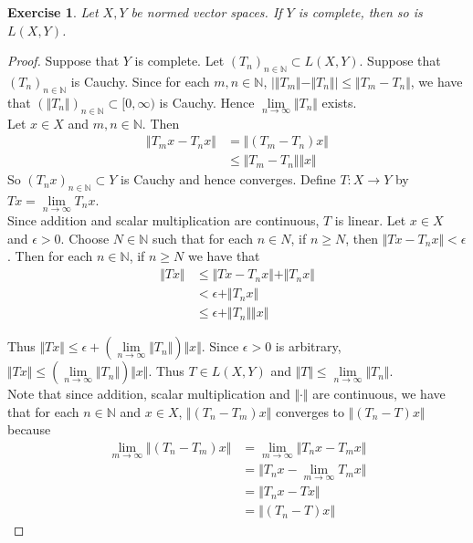 \documentclass[12pt]{amsart}
\newtheorem{ex}[thm]{Exercise}
\newcommand{\ep}{\epsilon}
\newcommand{\N}{\mathbb{N}}
\newcommand{\Rg}{[0,\infty)}
\newcommand{\limn}{\lim \limits_{n \rightarrow \infty}}
\newcommand{\n}{\Vert}
\begin{document}
\begin{ex}
Let $X,Y$ be normed vector spaces. If $Y$ is complete, then so is $L(X,Y)$.
\end{ex}

\begin{proof}
Suppose that $Y$ is complete. Let $(T_n)_{n \in \N} \subset L(X,Y)$. Suppose that $(T_n)_{n \in \N}$ is Cauchy. Since for each $m,n \in \N$, $\big\vert \n T_m \n - \n T_n \n \big\vert \leq \n T_m -T_n \n$, we have that $(\n T_n \n )_{n \in \N} \subset \Rg$ is Cauchy. Hence $\lim\limits_{n \rightarrow \infty}\n T_n \n$ exists. \vspace{1cm} \\ Let $x \in X$ and $m,n \in \N$. Then 
\begin{align*}
\n T_m x - T_n x \n 
&= \n (T_m-T_n) x \n \\
&\leq \n T_m-T_n \n \n x \n
\end{align*}
So $(T_nx)_{n \in \N} \subset Y$ is Cauchy and hence converges. Define $T:X \rightarrow Y$ by $Tx = \lim\limits_{n \rightarrow \infty} T_nx$. \vspace{1cm}\\
Since addition and scalar multiplication are continuous, $T$ is linear. Let $x \in X$ and $\ep>0$. Choose $N \in \N$ such that for each $n \in N$, if $n \geq N$, then $\n Tx - T_n x\n < \ep$. Then for each $n \in \N$, if $n \geq N$ we have that 
\begin{align*}
\n Tx\n 
&\leq \n Tx-T_nx \n + \n T_nx \n\\
 &< \ep + \n T_nx \n\\
 &\leq \ep + \n T_n \n \n x \n 
\end{align*}  

Thus $\n Tx \n \leq \ep +(\lim\limits_{n \rightarrow \infty} \n T_n \n) \n x \n$. Since $\ep >0$ is arbitrary, $\n Tx \n \leq (\lim\limits_{n \rightarrow \infty} \n T_n \n) \n x \n$. Thus $T \in L(X,Y)$ and $\n T \n \leq \limn \n T_n \n$. \vspace{1cm} \\
 Note that since addition, scalar multiplication and $\n \cdot \n$ are continuous, we have that for each $n \in \N$ and $x \in X$, $\n (T_n-T_m)x \n $ converges to $\n (T_n-T)x \n$ because 
\begin{align*}
\lim_{m \rightarrow \infty} \n (T_n-T_m)x \n
&= \lim_{m \rightarrow \infty} \n T_nx-T_mx \n\\
&= \n T_nx-\lim_{m \rightarrow \infty}T_mx \n\\
&=\n T_nx-Tx \n\\
&= \n (T_n-T)x \n
\end{align*} 


\end{proof}
\end{document}

